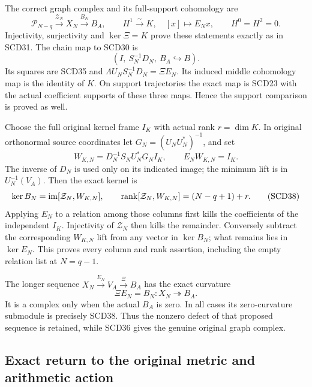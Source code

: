 \documentclass[11pt,a4paper]{article}
\theoremstyle{definition}\newtheorem{definition}[theorem]{Definition}
\newcommand{\rk}{\operatorname{rank}}\newcommand{\cl}{\operatorname{cl}}
\newcommand{\Pp}{\mathcal P}\newcommand{\LL}{\mathcal L}
\begin{document}
The correct graph complex and its full-support cohomology are
\[
 \Pp_{N-q}\xrightarrow{\mathcal Z_N}X_N\xrightarrow{B_N}B_A,
 \qquad H^1\xrightarrow{\sim}K,\quad[x]\mapsto E_Nx,
 \qquad H^0=H^2=0 .
 \tag{SCD36}
\]
Injectivity, surjectivity and \(\ker\Xi=K\) prove these statements
exactly as in SCD31. The chain map to SCD30 is
\[
 (I,\ S_N^{-1}D_N,\ B_A\hookrightarrow B).
 \tag{SCD37}
\]
Its squares are SCD35 and
\(\Lambda U_NS_N^{-1}D_N=\Xi E_N\). Its induced middle
cohomology map is the identity of \(K\). On support trajectories
the exact map is SCD23 with the actual coefficient supports of
these three maps. Hence the support comparison is proved as well.

Choose the full original kernel frame \(I_K\) with actual rank
\(r=\dim K\). In original orthonormal source coordinates let
\(G_N=(U_NU_N^*)^{-1}\), and set
\[
 W_{K,N}=D_N^{-1}S_NU_N^*G_NI_K,\qquad
 E_NW_{K,N}=I_K .
\]
The inverse of \(D_N\) is used only on its indicated image;
the minimum lift is in \(U_N^{-1}(V_A)\). Then the exact kernel is
\[
 \ker B_N=\im[\mathcal Z_N,W_{K,N}],\qquad
 \rk[\mathcal Z_N,W_{K,N}]=(N-q+1)+r .
 \tag{SCD38}
\]
Applying \(E_N\) to a relation among those columns first kills
the coefficients of the independent \(I_K\). Injectivity of
\(\mathcal Z_N\) then kills the remainder. Conversely subtract
the corresponding \(W_{K,N}\) lift from any vector in \(\ker B_N\);
what remains lies in \(\ker E_N\). This proves every column and
rank assertion, including the empty relation list at \(N=q-1\).

The longer sequence \(X_N\xrightarrow{E_N}V_A\xrightarrow{\Xi}B_A\)
has the exact curvature
\[
 \Xi E_N=B_N:X_N\twoheadrightarrow B_A .
 \tag{SCD39}
\]
It is a complex only when the actual \(B_A\) is zero. In all cases
its zero-curvature submodule is precisely SCD38. Thus the nonzero
defect of that proposed sequence is retained, while SCD36 gives
the genuine original graph complex.

\subsection{Exact return to the original metric and arithmetic action}
\end{document}
